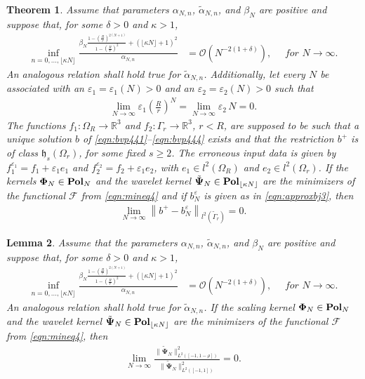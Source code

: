 \documentclass[a4paper, 10pt]{article}
\numberwithin{equation}{section}
\newtheorem{thm}{Theorem}[section]
\newtheorem{lem}[thm]{Lemma}
\theoremstyle{definition}
\newcommand{\eps}{\ensuremath{\varepsilon}}
\begin{document}
\begin{thm}\label{thm:convres2}
Assume that parameters $\alpha_{N,n}$, $\tilde{\alpha}_{N,n}$, and $\beta_N$ are positive and suppose that, for some $\delta>0$ and $\kappa>1$,
\begin{align}
\inf_{n=0,\ldots, \lfloor \kappa N\rfloor}\frac{\beta_N\frac{1-\left(\frac{R}{r}\right)^{2(N+1)}}{1-\left(\frac{R}{r}\right)^2}+(\lfloor \kappa N\rfloor+1)^2}{{\alpha}_{N,n}}&=\mathcal{O}\left(N^{-2(1+\delta)}\right),\quad \textit{ for }N\to\infty.\label{eqn:ass4}
\end{align}
An analogous relation shall hold true for $\tilde{\alpha}_{N,n}$. Additionally, let every $N$ be associated with an $\varepsilon_1=\varepsilon_1(N)>0$ and an $\varepsilon_2=\varepsilon_2(N)>0$ such that 
\begin{align}
\lim_{N\to\infty}\varepsilon_1 \left(\frac{R}{r}\right)^{N}=\lim_{N\to\infty}\varepsilon_2\, {N}=0.\label{eqn:propx3}
\end{align}
The functions $f_1:\Omega_R\to\mathbb{R}^3$ and $f_2:\Gamma_r\to\mathbb{R}^3$, $r<R$, are supposed to be such that a unique solution $b$ of \eqref{eqn:bvp441}--\eqref{eqn:bvp444} exists and that the restriction $b^+$ is of class $\mathfrak{h}_s(\Omega_r)$, for some fixed $s\geq 2$. The erroneous input data is given by $f_1^{\eps_1}=f_1+\eps_1 e_1$ and $f_2^{\eps_2}=f_2+\eps_1 e_2$, with $e_1\in l^2(\Omega_R)$ and $e_2\in l^2(\Omega_r)$. If the kernels $\mathbf{\Phi}_N\in\textnormal{\textbf{Pol}}_{N}$ and the wavelet kernel $\tilde{\mathbf{\Psi}}_N\in\textnormal{\textbf{Pol}}_{\lfloor \kappa N\rfloor}$ are the minimizers of the functional $\mathcal{F}$ from \eqref{eqn:mineq4} and if $b_N^\eps$ is given as in \eqref{eqn:approxbj3}, then
\begin{align}
\lim_{N\to\infty}\left\|b^+-b_ {N}^{\varepsilon}\right\|_{l^2(\tilde{\Gamma}_r)}=0.\label{eqn:convres3}
\end{align}
\end{thm}

\begin{lem}\label{lem:lockernel2}
Assume that the parameters $\alpha_{N,n}$, $\tilde{\alpha}_{N,n}$, and $\beta_N$ are positive and suppose that, for some $\delta>0$ and $\kappa>1$,
\begin{align}
\inf_{n=0,\ldots, \lfloor \kappa N\rfloor}\frac{\beta_N\frac{1-\left(\frac{R}{r}\right)^{2(N+1)}}{1-\left(\frac{R}{r}\right)^2}+(\lfloor \kappa N\rfloor+1)^2}{{\alpha}_{N,n}}&=\mathcal{O}\left(N^{-2(1+\delta)}\right),\quad \textit{ for }N\to\infty.\label{eqn:ass5}
\end{align}
An analogous relation shall hold true for $\tilde{\alpha}_{N,n}$. If the scaling kernel $\mathbf{\Phi}_N\in\textnormal{\textbf{Pol}}_{N}$ and the wavelet kernel $\tilde{\mathbf{\Psi}}_N\in\textnormal{\textbf{Pol}}_{\lfloor \kappa N\rfloor}$ are the minimizers of the functional $\mathcal{F}$ from \eqref{eqn:mineq4}, then
\begin{align} \label{eqn:optloc3}
\lim_{N\to\infty}\frac{\big\|\tilde{\mathbf{\Psi}}_N\big\|^2_{L^2([-1,1-\rho])}}{\big\|\tilde{\mathbf{\Psi}}_N\big\|^2_{L^2([-1,1])}}=0.
\end{align}
\end{lem}
\end{document}
